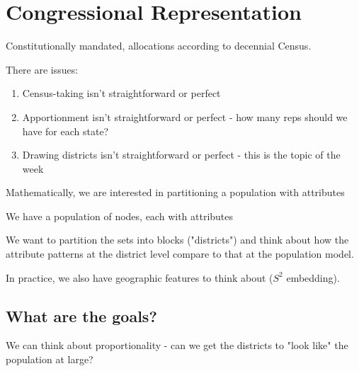 






\section*{Congressional Representation}
Constitutionally mandated, allocations according to decennial Census.


There are issues:

\begin{enumerate}
\item[] Census-taking isn't straightforward or perfect
\item[] Apportionment isn't straightforward or perfect - how many reps should we have for each state?
\item[] Drawing districts isn't straightforward or perfect - this is the topic of the week

\end{enumerate}









Mathematically, we are interested in partitioning a population with attributes

We have a population of nodes, each with attributes

We want to partition the sets into blocks ("districts") and think about how the attribute patterns at the district level compare to that at the population model.

In practice, we also have geographic features to think about ($S^2$ embedding).

\subsection*{What are the goals?}

We can think about proportionality - can we get the districts to "look like" the population at large?

